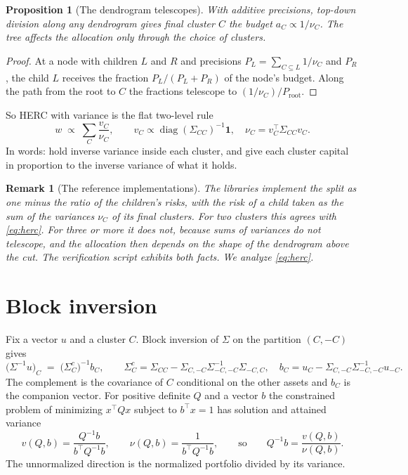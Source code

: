 \documentclass[11pt]{article}
\newcommand{\ones}{\mathbf{1}}
\DeclareMathOperator{\diag}{diag}
\newtheorem{proposition}{Proposition}
\newtheorem{remark}{Remark}
\begin{document}
\begin{proposition}[The dendrogram telescopes]
\label{prop:telescope}
With additive precisions, top-down division along any dendrogram gives
final cluster $C$ the budget $a_C\propto1/\nu_C$. The tree affects the
allocation only through the choice of clusters.
\end{proposition}

\begin{proof}
At a node with children $L$ and $R$ and precisions $P_L=\sum_{C\subseteq L}1/\nu_C$
and $P_R$, the child $L$ receives the fraction $P_L/(P_L+P_R)$ of the node's
budget. Along the path from the root to $C$ the fractions telescope to
$(1/\nu_C)/P_{\mathrm{root}}$.
\end{proof}

So HERC with variance is the flat two-level rule
\begin{equation}
  w \;\propto\; \sum_{C}\frac{v_C}{\nu_C},
  \qquad v_C\propto\diag(\Sigma_{CC})^{-1}\ones,\quad
  \nu_C=v_C^\top\Sigma_{CC}v_C .
  \label{eq:herc}
\end{equation}
In words: hold inverse variance inside each cluster, and give each cluster
capital in proportion to the inverse variance of what it holds.

\begin{remark}[The reference implementations]
The libraries \cite{riskfolio,skfolio,mlfinlab} implement the split as one
minus the ratio of the children's risks, with the risk of a child taken as
the sum of the variances $\nu_C$ of its final clusters. For two clusters
this agrees with \eqref{eq:herc}. For three or more it does not, because
sums of variances do not telescope, and the allocation then depends on the
shape of the dendrogram above the cut. The verification script exhibits
both facts. We analyze \eqref{eq:herc}.
\end{remark}

\section{Block inversion}

Fix a vector $u$ and a cluster $C$. Block inversion of $\Sigma$ on the
partition $(C,-C)$ gives \cite[App.~A]{cotton2024schur}
\begin{equation}
  \big(\Sigma^{-1}u\big)_{C}
  \;=\; \big(\Sigma^{c}_{C}\big)^{-1} b_C,
  \qquad
  \Sigma^{c}_{C} = \Sigma_{CC}-\Sigma_{C,-C}\Sigma_{-C,-C}^{-1}\Sigma_{-C,C},
  \quad
  b_C = u_{C}-\Sigma_{C,-C}\Sigma_{-C,-C}^{-1}u_{-C} .
  \label{eq:blockinv}
\end{equation}
The complement is the covariance of $C$ conditional on the other assets and
$b_C$ is the companion vector. For positive definite $Q$ and a vector $b$
the constrained problem of minimizing $x^\top Qx$ subject to $b^\top x=1$
has solution and attained variance
\begin{equation}
  v(Q,b)=\frac{Q^{-1}b}{b^\top Q^{-1}b},
  \qquad
  \nu(Q,b)=\frac{1}{b^\top Q^{-1}b},
  \qquad\text{so}\qquad
  Q^{-1}b=\frac{v(Q,b)}{\nu(Q,b)} .
  \label{eq:fitness}
\end{equation}
The unnormalized direction is the normalized portfolio divided by its
variance.
\end{document}
